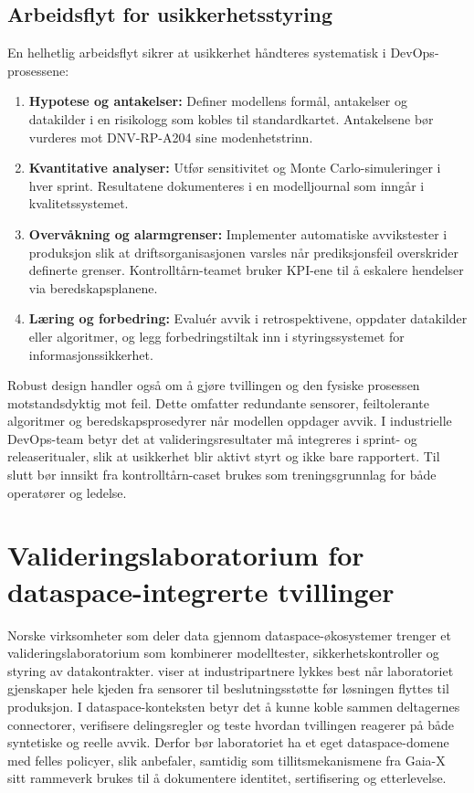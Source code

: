 \subsection{Arbeidsflyt for usikkerhetsstyring}
En helhetlig arbeidsflyt sikrer at usikkerhet håndteres systematisk i DevOps-prosessene:
\begin{enumerate}
    \item \textbf{Hypotese og antakelser:} Definer modellens formål, antakelser og datakilder i en risikologg som kobles til standardkartet. Antakelsene bør vurderes mot DNV-RP-A204 sine modenhetstrinn.
    \item \textbf{Kvantitative analyser:} Utfør sensitivitet og Monte Carlo-simuleringer i hver sprint. Resultatene dokumenteres i en modelljournal som inngår i kvalitetssystemet.
    \item \textbf{Overvåkning og alarmgrenser:} Implementer automatiske avvikstester i produksjon slik at driftsorganisasjonen varsles når prediksjonsfeil overskrider definerte grenser. Kontrolltårn-teamet bruker KPI-ene til å eskalere hendelser via beredskapsplanene.
    \item \textbf{Læring og forbedring:} Evaluér avvik i retrospektivene, oppdater datakilder eller algoritmer, og legg forbedringstiltak inn i styringssystemet for informasjonssikkerhet.
\end{enumerate}

Robust design handler også om å gjøre tvillingen og den fysiske prosessen motstandsdyktig mot feil. Dette omfatter redundante sensorer, feiltolerante algoritmer og beredskapsprosedyrer når modellen oppdager avvik. I industrielle DevOps-team betyr det at valideringsresultater må integreres i sprint- og releaseritualer, slik at usikkerhet blir aktivt styrt og ikke bare rapportert. Til slutt bør innsikt fra kontrolltårn-caset brukes som treningsgrunnlag for både operatører og ledelse.

\section{Valideringslaboratorium for dataspace-integrerte tvillinger}
Norske virksomheter som deler data gjennom dataspace-økosystemer trenger et valideringslaboratorium som kombinerer modelltester, sikkerhetskontroller og styring av datakontrakter. \citet{sintef2021digital} viser at industripartnere lykkes best når laboratoriet gjenskaper hele kjeden fra sensorer til beslutningsstøtte før løsningen flyttes til produksjon. I dataspace-konteksten betyr det å kunne koble sammen deltagernes connectorer, verifisere delingsregler og teste hvordan tvillingen reagerer på både syntetiske og reelle avvik. Derfor bør laboratoriet ha et eget dataspace-domene med felles policyer, slik \citet{idsa2023operational} anbefaler, samtidig som tillitsmekanismene fra Gaia-X sitt rammeverk brukes til å dokumentere identitet, sertifisering og etterlevelse.\citep{gaiax2023architecture}

